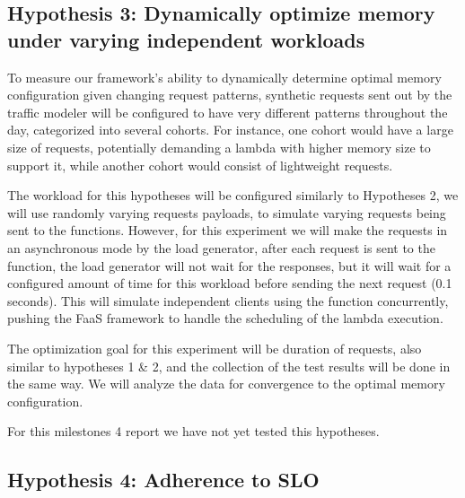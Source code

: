 \documentclass[conference]{IEEEtran}
\begin{document}
\subsection{Hypothesis 3: Dynamically optimize memory under varying independent workloads}

To measure our framework's ability to dynamically determine optimal memory configuration given changing request patterns, synthetic requests sent out by the traffic modeler will be configured to have very different patterns throughout the day, categorized into several cohorts. For instance, one cohort would have a large size of requests, potentially demanding a lambda with higher memory size to support it, while another cohort would consist of lightweight requests. 

The workload for this hypotheses will be configured similarly to Hypotheses 2, we will use randomly varying requests payloads, to simulate varying requests being sent to the functions. However, for this experiment we will make the requests in an asynchronous mode by the load generator, after each request is sent to the function, the load generator will not wait for the responses, but it will wait for a configured amount of time for this workload before sending the next request (0.1 seconds). This will simulate independent clients using the function concurrently, pushing the FaaS framework to handle the scheduling of the lambda execution.

The optimization goal for this experiment will be duration of requests, also similar to hypotheses 1 & 2, and the collection of the test results will be done in the same way. We will analyze the data for convergence to the optimal memory configuration.

For this milestones 4 report we have not yet tested this hypotheses.



\subsection{Hypothesis 4: Adherence to SLO}
\end{document}
